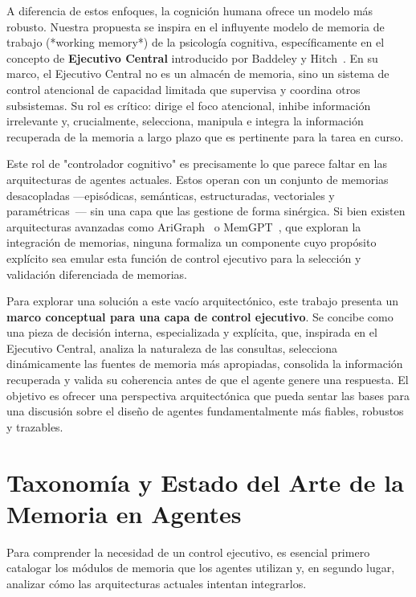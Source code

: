 \documentclass[journal,onecolumn]{IEEEtran}
\begin{document}
A diferencia de estos enfoques, la cognición humana ofrece un modelo más robusto. Nuestra propuesta se inspira en el influyente modelo de memoria de trabajo (*working memory*) de la psicología cognitiva, específicamente en el concepto de \textbf{Ejecutivo Central} introducido por Baddeley y Hitch~\cite{baddeley1974working}. En su marco, el Ejecutivo Central no es un almacén de memoria, sino un sistema de control atencional de capacidad limitada que supervisa y coordina otros subsistemas. Su rol es crítico: dirige el foco atencional, inhibe información irrelevante y, crucialmente, selecciona, manipula e integra la información recuperada de la memoria a largo plazo que es pertinente para la tarea en curso.

Este rol de "controlador cognitivo" es precisamente lo que parece faltar en las arquitecturas de agentes actuales. Estos operan con un conjunto de memorias desacopladas —episódicas, semánticas, estructuradas, vectoriales y paramétricas~\cite{zeng2024structural}— sin una capa que las gestione de forma sinérgica. Si bien existen arquitecturas avanzadas como AriGraph~\cite{anokhin2024arigraph} o MemGPT~\cite{packer2023memgpt}, que exploran la integración de memorias, ninguna formaliza un componente cuyo propósito explícito sea emular esta función de control ejecutivo para la selección y validación diferenciada de memorias.

Para explorar una solución a este vacío arquitectónico, este trabajo presenta un \textbf{marco conceptual para una capa de control ejecutivo}. Se concibe como una pieza de decisión interna, especializada y explícita, que, inspirada en el Ejecutivo Central, analiza la naturaleza de las consultas, selecciona dinámicamente las fuentes de memoria más apropiadas, consolida la información recuperada y valida su coherencia antes de que el agente genere una respuesta. El objetivo es ofrecer una perspectiva arquitectónica que pueda sentar las bases para una discusión sobre el diseño de agentes fundamentalmente más fiables, robustos y trazables.

\section{Taxonomía y Estado del Arte de la Memoria en Agentes}
\label{sec:memory_types}

Para comprender la necesidad de un control ejecutivo, es esencial primero catalogar los módulos de memoria que los agentes utilizan y, en segundo lugar, analizar cómo las arquitecturas actuales intentan integrarlos.
\end{document}
